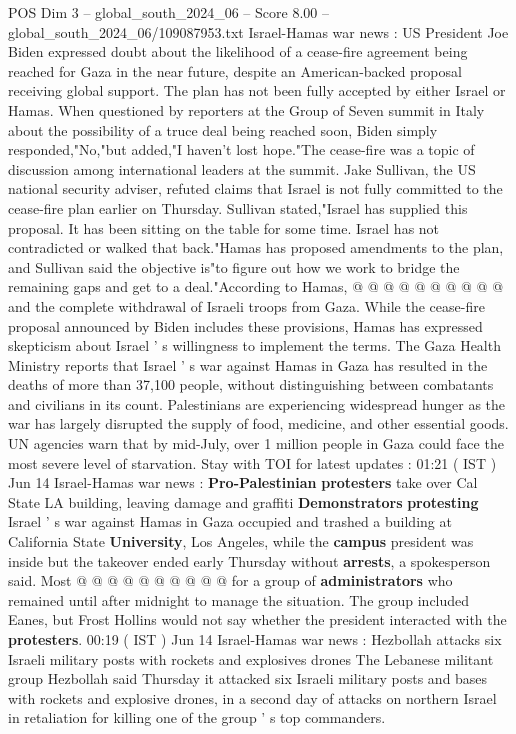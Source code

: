 \begin{textsample}{POS Dim 3 – global\_south\_2024\_06 – Score 8.00 – global\_south\_2024\_06/109087953.txt}  \label{ex:f3_pos_347}
Israel-Hamas war news : US President Joe Biden expressed doubt about the likelihood of a cease-fire agreement being reached for Gaza in the near future, despite an American-backed proposal receiving global support.
The plan has not been fully accepted by either Israel or Hamas.
When questioned by reporters at the Group of Seven summit in Italy about the possibility of a truce deal being reached soon, Biden simply responded,"No,"but added,"I haven't lost hope."The cease-fire was a topic of discussion among international leaders at the summit.
Jake Sullivan, the US national security adviser, refuted claims that Israel is not fully committed to the cease-fire plan earlier on Thursday.
Sullivan stated,"Israel has supplied this proposal.
It has been sitting on the table for some time.
Israel has not contradicted or walked that back."Hamas has proposed amendments to the plan, and Sullivan said the objective is"to figure out how we work to bridge the remaining gaps and get to a deal."According to Hamas, @ @ @ @ @ @ @ @ @ @ and the complete withdrawal of Israeli troops from Gaza.
While the cease-fire proposal announced by Biden includes these provisions, Hamas has expressed skepticism about Israel ' s willingness to implement the terms.
The Gaza Health Ministry reports that Israel ' s war against Hamas in Gaza has resulted in the deaths of more than 37,100 people, without distinguishing between combatants and civilians in its count.
Palestinians are experiencing widespread hunger as the war has largely disrupted the supply of food, medicine, and other essential goods.
UN agencies warn that by mid-July, over 1 million people in Gaza could face the most severe level of starvation.
Stay with TOI for latest updates : 01:21 ( IST ) Jun 14 Israel-Hamas war news : \textbf{Pro-Palestinian} \textbf{protesters} take over Cal State LA building, leaving damage and graffiti \textbf{Demonstrators} \textbf{protesting} Israel ' s war against Hamas in Gaza occupied and trashed a building at California State \textbf{University}, Los Angeles, while the \textbf{campus} president was inside but the takeover ended early Thursday without \textbf{arrests}, a spokesperson said.
Most @ @ @ @ @ @ @ @ @ @ for a group of \textbf{administrators} who remained until after midnight to manage the situation.
The group included Eanes, but Frost Hollins would not say whether the president interacted with the \textbf{protesters}. 00:19 ( IST ) Jun 14 Israel-Hamas war news : Hezbollah attacks six Israeli military posts with rockets and explosives drones The Lebanese militant group Hezbollah said Thursday it attacked six Israeli military posts and bases with rockets and explosive drones, in a second day of attacks on northern Israel in retaliation for killing one of the group ' s top commanders.

\end{textsample}
